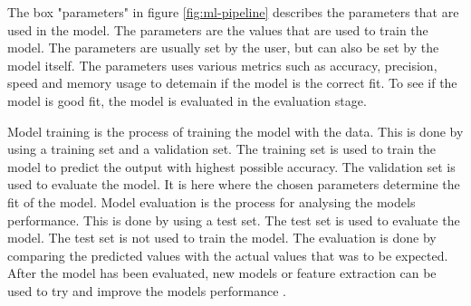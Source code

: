 The box "parameters" in figure \ref{fig:ml-pipeline} describes the parameters that are used in the model. The parameters are the values that are used to train the model. The parameters are usually set by the user, but can also be set by the model itself. The parameters uses various metrics such as accuracy, precision, speed and memory usage to detemain if the model is the correct fit. To see if the model is good fit, the model is evaluated in the evaluation stage.

Model training is the process of training the model with the data. This is done by using a training set and a validation set. The training set is used to train the model to predict the output with highest possible accuracy. The validation set is used to evaluate the model. It is here where the chosen parameters determine the fit of the model.
Model evaluation is the process for analysing the models performance. This is done by using a test set. The test set is used to evaluate the model. The test set is not used to train the model. The evaluation is done by comparing the predicted values with the actual values that was to be expected. After the model has been evaluated, new models or feature extraction can be used to try and improve the models performance \cite{ml-pipeline-javapoint}.
